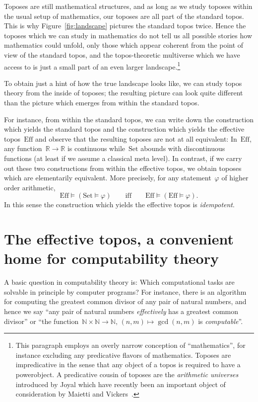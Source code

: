 \documentclass[oneside,reqno]{amsart}
\theoremstyle{definition}
\theoremstyle{plain}
\theoremstyle{remark}
\newcommand{\NN}{\mathbb{N}}
\newcommand{\RR}{\mathbb{R}}
\newcommand{\Set}{\mathrm{Set}}
\newcommand{\Eff}{\mathrm{Ef{}f}}
\renewcommand{\_}{\mathpunct{.}\,}
\newcommand{\effective}{ef{}fective\xspace}
\newcommand{\effectively}{ef{}fectively\xspace}
\newcommand{\?}{\,{:}\,}
\begin{document}
Toposes are still mathematical structures, and as long as we study
toposes within the usual setup of mathematics, our toposes are all part of the
standard topos. This is why Figure~\ref{fig:landscape} pictures the standard
topos twice. Hence the toposes which we can study in mathematics do not tell us
all possible stories how mathematics could unfold, only those which appear
coherent from the point of view of the standard topos, and the topos-theoretic
multiverse which we have access to is just a small part of an even larger
landscape.\footnote{This paragraph employs an overly narrow conception of
``mathematics'', for instance excluding any predicative flavors of mathematics.
Toposes are impredicative in the sense that any object of a topos is required to have a
powerobject. A predicative cousin of toposes are the \emph{arithmetic
universes} introduced by Joyal which have recently been an important object of
consideration by Maietti and
Vickers~\cite{maietti:au,maietti-vickers:induction,vickers:sketches}.}

To obtain just a hint of how the true landscape looks like, we can study topos
theory from the inside of toposes; the resulting picture can look quite
different than the picture which emerges from within the standard topos.

For instance, from within the standard topos, we can write down the
construction which yields the standard topos and the construction which yields
the \effective topos~$\Eff$ and observe that the resulting toposes are not at
all equivalent: In~$\Eff$, any function~$\RR \to \RR$ is continuous
while~$\Set$ abounds with discontinuous functions (at least if we assume a
classical meta level). In contrast, if we carry out these two constructions
from within the \effective topos, we obtain toposes which are elementarily
equivalent. More precisely, for any statement~$\varphi$ of higher order
arithmetic,
\[ \Eff \models (\Set \models \varphi) \qquad\text{iff}\qquad\Eff \models
  (\Eff \models \varphi). \]
In this sense the construction which yields the \effective topos is
\emph{idempotent}.


\section{The \effective topos, a convenient home for computability theory}
\label{sect:effective-topos}

A basic question in computability theory is: Which computational tasks are
solvable in principle by computer programs? For instance, there is an algorithm
for computing the greatest common divisor of any pair of natural numbers, and
hence we say ``any pair of natural numbers \emph{\effectively} has a greatest
common divisor''  or ``the function~$\NN \times \NN \to \NN,\,(n,m) \mapsto
\operatorname{gcd}(n,m)$ is \emph{computable}''.
\end{document}
